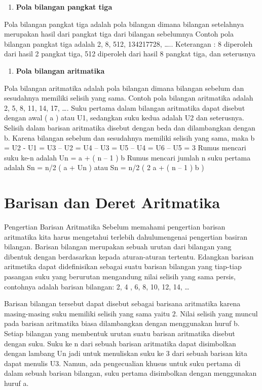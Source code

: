 \documentclass[11pt,fleqn]{book} %
\begin{document}
\noindent
\begin{enumerate}
	\item  \textbf{  Pola bilangan pangkat tiga}
\end{enumerate}
\noindent
\noindent     Pola bilangan pangkat tiga adalah pola bilangan dimana bilangan setelahnya merupakan hasil dari pangkat tiga dari bilangan sebelumnya
\noindent  Contoh pola bilangan pangkat tiga adalah 2, 8, 512, 134217728, …..
\noindent  Keterangan : 8 diperoleh dari hasil 2 pangkat tiga, 512 diperoleh dari hasil 8 pangkat tiga, dan seterusnya

\noindent
\begin{enumerate}
	\item  \textbf{  Pola bilangan aritmatika}
\end{enumerate}
\noindent
\noindent Pola bilangan aritmatika adalah pola bilangan dimana bilangan sebelum dan sesudahnya memiliki selisih yang sama.
\noindent Contoh pola bilangan aritmatika adalah 2, 5, 8, 11, 14, 17, ….
\noindent Suku pertama dalam bilangan aritmatika dapat disebut dengan awal ( a ) atau U1, sedangkan suku kedua adalah U2 dan seterusnya.
\noindent Selisih dalam barisan aritmatika disebut dengan beda dan dilambangkan dengan b.
\noindent Karena bilangan sebelum dan sesudahnya memiliki selisih yang sama, maka b = U2 - U1 = U3 – U2 = U4 – U3 = U5 – U4 = U6 – U5 = 3
\noindent Rumus mencari suku ke-n adalah Un = a + ( n – 1 ) b
\noindent Rumus mencari jumlah n suku pertama adalah Sn = n/2 ( a + Un ) atau Sn = n/2 ( 2 a + ( n – 1 ) b )
\noindent




\section{Barisan dan Deret Aritmatika}
Pengertian Barisan Aritmatika
Sebelum memahami pengertian barisan aritmatika kita harus mengetahui terlebih dahulumengenai pengertian basiran bilangan. Barisan bilangan merupakan sebuah urutan dari bilangan yang dibentuk dengan berdasarkan kepada aturan-aturan tertentu. Edangkan barisan aritmetika dapat didefinisikan sebagai suatu barisan bilangan yang tiap-tiap pasangan suku yang berurutan mengandung nilai selisih yang sama persis, contohnya adalah barisan bilangan: 2, 4 , 6, 8, 10, 12, 14, …

Barisan bilangan tersebut dapat disebut sebagai barisana aritmatika karena masing-masing suku memiliki selisih yang sama yaitu 2. Nilai selisih yang muncul pada barisan aritmatika biasa dilambangkan dengan menggunakan huruf b. Setiap bilangan yang membentuk urutan suatu barisan aritmatika disebut dengan suku. Suku ke n dari sebuah barisan aritmatika dapat disimbolkan dengan lambang Un jadi untuk menuliskan suku ke 3 dari sebuah barisan kita dapat menulis U3. Namun, ada pengecualian khusus untuk suku pertama di dalam sebuah barisan bilangan, suku pertama disimbolkan dengan menggunakan huruf a.
\end{document}

